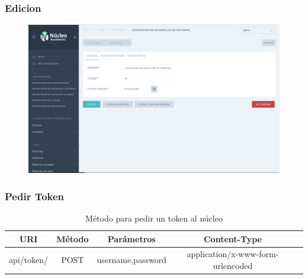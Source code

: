 \subsubsection{Edicion}
\begin{figure}[h!]
  \centering
    \includegraphics[scale=0.3]{images/nucleo/nucleo-edit.png}
  \label{fig:nucleo-edicion}
\end{figure}

\subsubsection{Pedir Token}
\begin{table}[!htbp]
    \centering
    \makegapedcells
    \begin{tabular}{|c|c|c|c|c|}
    \hline
    URI & Método & Parámetros & Content-Type \\ \hline
    api/token/ & POST & username,password & application/x-www-form-urlencoded \\ \hline
    \end{tabular}
    \caption{Método para pedir un token al núcleo}
    \label{tab:tabla_token}
\end{table}

